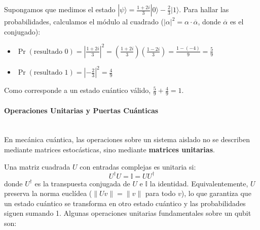 \documentclass[12pt, a4paper]{article}
\begin{document}
\begin{tcolorbox}[colback=gray!5!white,colframe=gray!75!black,title=\textbf{Ejemplo: Medición de un estado con amplitudes complejas}]
Supongamos que medimos el estado $|\psi\rangle = \frac{1+2i}{3}|0\rangle - \frac{2}{3}|1\rangle$. Para hallar las probabilidades, calculamos el módulo al cuadrado ($|\alpha|^2 = \alpha \cdot \overline{\alpha}$, donde $\overline{\alpha}$ es el conjugado):
\begin{itemize}
    \item $\Pr(\text{resultado } 0) = \left| \frac{1+2i}{3} \right|^2 = \left( \frac{1+2i}{3} \right) \left( \frac{1-2i}{3} \right) = \frac{1 - (-4)}{9} = \frac{5}{9}$
    \item $\Pr(\text{resultado } 1) = \left| -\frac{2}{3} \right|^2 = \frac{4}{9}$
\end{itemize}
Como corresponde a un estado cuántico válido, $\frac{5}{9} + \frac{4}{9} = 1$.
\end{tcolorbox}

\paragraph{Operaciones Unitarias y Puertas Cuánticas}\mbox{}\\

\noindent En mecánica cuántica, las operaciones sobre un sistema aislado no se describen mediante matrices estocásticas, sino mediante \textbf{matrices unitarias}.

Una matriz cuadrada $U$ con entradas complejas es unitaria si:
\[ U^\dagger U = \mathbb{I} = U U^\dagger \]
donde $U^\dagger$ es la transpuesta conjugada de $U$ e $\mathbb{I}$ la identidad. Equivalentemente, $U$ preserva la norma euclídea ($\|Uv\| = \|v\|$ para todo $v$), lo que garantiza que un estado cuántico se transforma en otro estado cuántico y las probabilidades siguen sumando 1. Algunas operaciones unitarias fundamentales sobre un qubit son:
\end{document}
